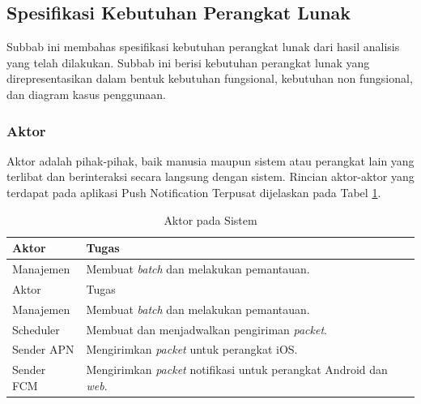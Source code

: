 \subsection{Spesifikasi Kebutuhan Perangkat Lunak}
\par Subbab ini membahas spesifikasi kebutuhan perangkat lunak dari hasil analisis yang telah dilakukan. Subbab ini berisi kebutuhan perangkat lunak yang direpresentasikan dalam bentuk kebutuhan fungsional, kebutuhan non fungsional, dan diagram kasus penggunaan.

\subsubsection{Aktor}
\par Aktor adalah pihak-pihak, baik manusia maupun sistem atau perangkat lain yang terlibat dan berinteraksi secara langsung dengan sistem. Rincian aktor-aktor yang terdapat pada aplikasi Push Notification Terpusat dijelaskan pada Tabel \ref{t:aktor}.
\begin{longtable}{|p{2cm}|p{7cm}|}
    \caption{Aktor pada Sistem} \label{t:aktor} \\ \hline
    \rowcolor{lightgray} Aktor & Tugas \\ \hline
    Manajemen & Membuat \textit{batch} dan melakukan pemantauan. \\ \hline
    \endfirsthead
    \hline
    \rowcolor{lightgray} Aktor & Tugas \\ \hline
    Manajemen & Membuat \textit{batch} dan melakukan pemantauan. \\ \hline
    \endhead
    Scheduler & Membuat dan menjadwalkan pengiriman \textit{packet}. \\ \hline
    Sender APN & Mengirimkan \textit{packet} untuk perangkat iOS. \\ \hline
    Sender FCM & Mengirimkan \textit{packet} notifikasi untuk perangkat Android dan \textit{web}. \\ \hline
\end{longtable}

